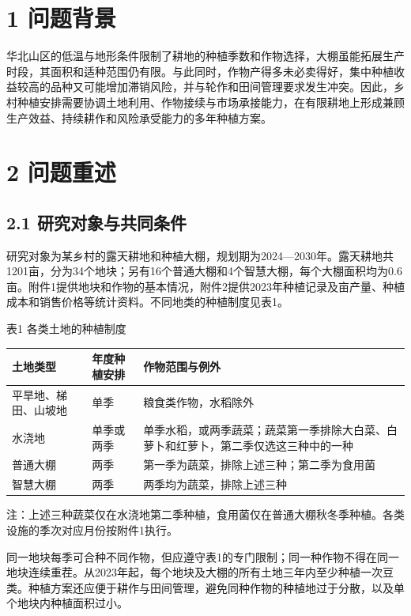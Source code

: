 \documentclass[11pt,a4paper]{article}
\begin{document}
\section*{1 问题背景}
华北山区的低温与地形条件限制了耕地的种植季数和作物选择，大棚虽能拓展生产时段，其面积和适种范围仍有限。与此同时，作物产得多未必卖得好，集中种植收益较高的品种又可能增加滞销风险，并与轮作和田间管理要求发生冲突。因此，乡村种植安排需要协调土地利用、作物接续与市场承接能力，在有限耕地上形成兼顾生产效益、持续耕作和风险承受能力的多年种植方案。\par
\section*{2 问题重述}
\subsection*{2.1 研究对象与共同条件}
研究对象为某乡村的露天耕地和种植大棚，规划期为2024—2030年。露天耕地共1201亩，分为34个地块；另有16个普通大棚和4个智慧大棚，每个大棚面积均为0.6亩。附件1提供地块和作物的基本情况，附件2提供2023年种植记录及亩产量、种植成本和销售价格等统计资料。不同地类的种植制度见表1。\par
\par\smallskip\noindent\begin{minipage}{\linewidth}
{\centering\small 表1 各类土地的种植制度\par}\smallskip
{\fontsize{10.5}{14}\selectfont\renewcommand{\arraystretch}{1.22}\begin{tabularx}{\linewidth}{>{\raggedright\arraybackslash}p{2.7cm}>{\raggedright\arraybackslash}p{2.4cm}>{\raggedright\arraybackslash}X}\toprule
土地类型 & 年度种植安排 & 作物范围与例外 \\
\midrule
平旱地、梯田、山坡地 & 单季 & 粮食类作物，水稻除外 \\
水浇地 & 单季或两季 & 单季水稻，或两季蔬菜；蔬菜第一季排除大白菜、白萝卜和红萝卜，第二季仅选这三种中的一种 \\
普通大棚 & 两季 & 第一季为蔬菜，排除上述三种；第二季为食用菌 \\
智慧大棚 & 两季 & 两季均为蔬菜，排除上述三种 \\
\bottomrule\end{tabularx}}\end{minipage}\par\smallskip
{\small\noindent 注：上述三种蔬菜仅在水浇地第二季种植，食用菌仅在普通大棚秋冬季种植。各类设施的季次对应月份按附件1执行。\par}\medskip
同一地块每季可合种不同作物，但应遵守表1的专门限制；同一种作物不得在同一地块连续重茬。从2023年起，每个地块及大棚的所有土地三年内至少种植一次豆类。种植方案还应便于耕作与田间管理，避免同种作物的种植地过于分散，以及单个地块内种植面积过小。\par
\end{document}
